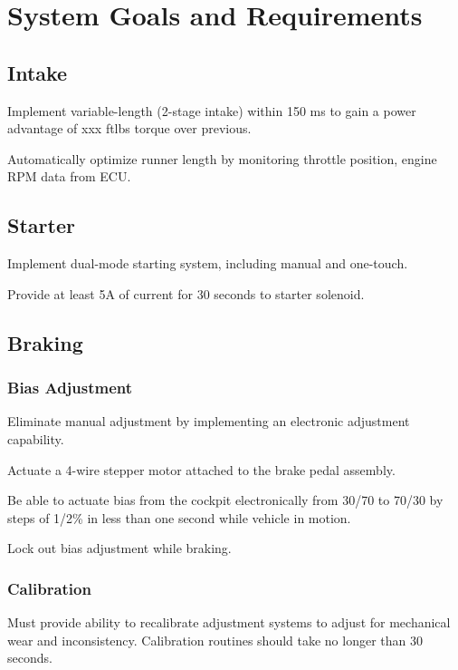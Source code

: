 \chapter{System Goals and Requirements\label{cha:goals_and_requirements}}



\section{Intake}

Implement variable-length (2-stage intake) within 150 ms to gain a
power advantage of xxx ftlbs torque over previous.

Automatically optimize runner length by monitoring throttle position,
engine RPM data from ECU.


\section{Starter}

Implement dual-mode starting system, including manual and one-touch.

Provide at least 5A of current for 30 seconds to starter solenoid.


\section{Braking}


\subsection{Bias Adjustment}

Eliminate manual adjustment by implementing an electronic adjustment
capability. 

Actuate a 4-wire stepper motor attached to the brake pedal assembly.

Be able to actuate bias from the cockpit electronically from 30/70
to 70/30 by steps of 1/2\% in less than one second while vehicle in
motion.

Lock out bias adjustment while braking.


\subsection{Calibration}

Must provide ability to recalibrate adjustment systems to adjust for
mechanical wear and inconsistency. Calibration routines should take
no longer than 30 seconds. 


